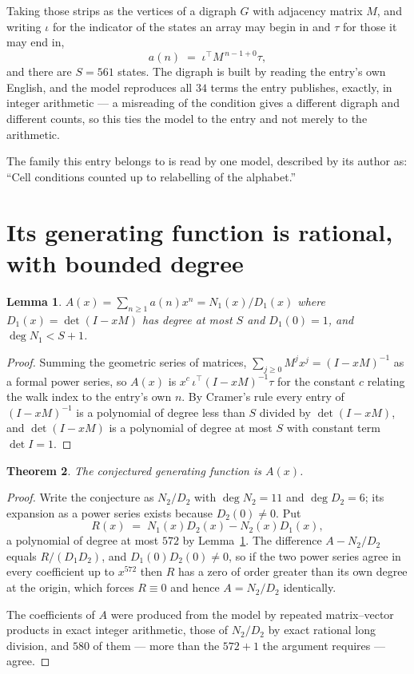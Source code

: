\documentclass[11pt,a4paper]{article}
\theoremstyle{plain}
\newtheorem{theorem}{Theorem}
\newtheorem{lemma}[theorem]{Lemma}
\theoremstyle{definition}
\begin{document}
Taking those strips as the vertices of a digraph $G$ with adjacency matrix $M$, and writing
$\iota$ for the indicator of the states an array may begin in and $\tau$ for those it may end
in,
\[
a(n)\;=\;\iota^{\!\top}M^{\,n-1+0}\tau ,
\]
and there are $S=561$ states. The digraph is built by reading the entry's own English, and the
model reproduces all $34$ terms the entry publishes, exactly, in integer arithmetic --- a
misreading of the condition gives a different digraph and different counts, so this ties the
model to the entry and not merely to the arithmetic.

The family this entry belongs to is read by one model, described by its author as: ``Cell conditions counted up to relabelling of the alphabet.''


\section{Its generating function is rational, with bounded degree}

\begin{lemma}\label{lem:rat}
$A(x)=\sum_{n\ge1}a(n)x^n=N_1(x)/D_1(x)$ where $D_1(x)=\det(I-xM)$ has degree at most
$S$ and $D_1(0)=1$, and $\deg N_1<S+1$.
\end{lemma}

\begin{proof}
Summing the geometric series of matrices, $\sum_{j\ge0}M^jx^j=(I-xM)^{-1}$ as a formal
power series, so $A(x)$ is $x^{c}\,\iota^{\!\top}(I-xM)^{-1}\tau$ for the constant $c$
relating the walk index to the entry's own $n$. By Cramer's rule every entry of
$(I-xM)^{-1}$ is a polynomial of degree less than $S$ divided by $\det(I-xM)$, and
$\det(I-xM)$ is a polynomial of degree at most $S$ with constant term $\det I=1$.
\end{proof}

\begin{theorem}
The conjectured generating function is $A(x)$.
\end{theorem}

\begin{proof}
Write the conjecture as $N_2/D_2$ with $\deg N_2=11$ and $\deg D_2=6$; its expansion as a
power series exists because $D_2(0)\neq0$. Put
\[
R(x)\;=\;N_1(x)D_2(x)-N_2(x)D_1(x),
\]
a polynomial of degree at most $572$ by Lemma~\ref{lem:rat}. The difference
$A-N_2/D_2$ equals $R/(D_1D_2)$, and $D_1(0)D_2(0)\neq0$, so if the two power series agree in
every coefficient up to $x^{572}$ then $R$ has a zero of order greater than its own
degree at the origin, which forces $R\equiv0$ and hence $A=N_2/D_2$ identically.

The coefficients of $A$ were produced from the model by repeated matrix--vector products in
exact integer arithmetic, those of $N_2/D_2$ by exact rational long division, and $580$
of them --- more than the $572+1$ the argument requires --- agree.
\end{proof}
\end{document}
